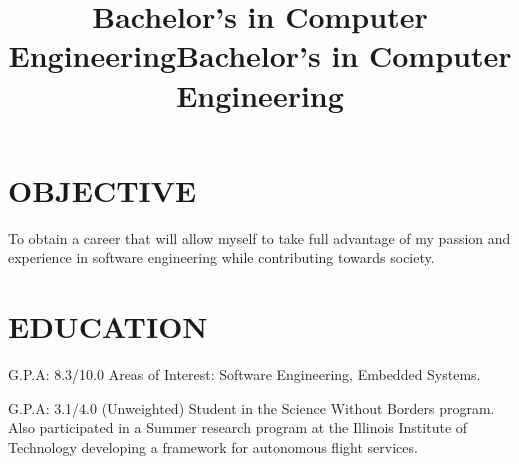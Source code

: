 \documentclass[margin, 10pt]{res} %
\begin{document}
\address{guilherme\_abinader@hotmail.com}
\address{github.com/guilhermesimas}
\address{+55 (21) 99424 6137}


\begin{resume}

 
\section{OBJECTIVE}  

To obtain a career that will allow myself to take full advantage of my passion and experience in software engineering while contributing towards society. 


\section{EDUCATION}
\title{Bachelor's in Computer Engineering}
\begin{position}
	G.P.A: 8.3/10.0 Areas of Interest: Software Engineering, Embedded Systems.
\end{position}
\title{Bachelor's in Computer Engineering}
\begin{position}
	G.P.A: 3.1/4.0 (Unweighted) Student in the Science Without Borders program. Also participated in a Summer research program at the Illinois Institute of Technology developing a framework for autonomous flight services.
\end{position}



\end{resume}
\end{document}
